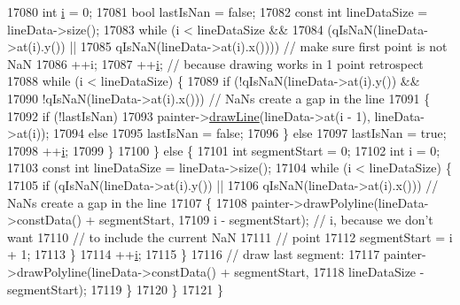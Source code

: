 \begin{DoxyCode}
17080       \textcolor{keywordtype}{int} \hyperlink{_comparision_pictures_2_createtest_image_8m_a6f6ccfcf58b31cb6412107d9d5281426}{i} = 0;
17081       \textcolor{keywordtype}{bool} lastIsNan = \textcolor{keyword}{false};
17082       \textcolor{keyword}{const} \textcolor{keywordtype}{int} lineDataSize = lineData->size();
17083       \textcolor{keywordflow}{while} (i < lineDataSize &&
17084              (qIsNaN(lineData->at(i).y()) ||
17085               qIsNaN(lineData->at(i).x()))) \textcolor{comment}{// make sure first point is not NaN}
17086         ++i;
17087       ++\hyperlink{_comparision_pictures_2_createtest_image_8m_a6f6ccfcf58b31cb6412107d9d5281426}{i}; \textcolor{comment}{// because drawing works in 1 point retrospect}
17088       \textcolor{keywordflow}{while} (i < lineDataSize) \{
17089         \textcolor{keywordflow}{if} (!qIsNaN(lineData->at(i).y()) &&
17090             !qIsNaN(lineData->at(i).x())) \textcolor{comment}{// NaNs create a gap in the line}
17091         \{
17092           \textcolor{keywordflow}{if} (!lastIsNan)
17093             painter->\hyperlink{class_q_c_p_painter_a0b4b1b9bd495e182c731774dc800e6e0}{drawLine}(lineData->at(i - 1), lineData->at(i));
17094           \textcolor{keywordflow}{else}
17095             lastIsNan = \textcolor{keyword}{false};
17096         \} \textcolor{keywordflow}{else}
17097           lastIsNan = \textcolor{keyword}{true};
17098         ++\hyperlink{_comparision_pictures_2_createtest_image_8m_a6f6ccfcf58b31cb6412107d9d5281426}{i};
17099       \}
17100     \} \textcolor{keywordflow}{else} \{
17101       \textcolor{keywordtype}{int} segmentStart = 0;
17102       \textcolor{keywordtype}{int} i = 0;
17103       \textcolor{keyword}{const} \textcolor{keywordtype}{int} lineDataSize = lineData->size();
17104       \textcolor{keywordflow}{while} (i < lineDataSize) \{
17105         \textcolor{keywordflow}{if} (qIsNaN(lineData->at(i).y()) ||
17106             qIsNaN(lineData->at(i).x())) \textcolor{comment}{// NaNs create a gap in the line}
17107         \{
17108           painter->drawPolyline(lineData->constData() + segmentStart,
17109                                 i - segmentStart); \textcolor{comment}{// i, because we don't want}
17110                                                    \textcolor{comment}{// to include the current NaN}
17111                                                    \textcolor{comment}{// point}
17112           segmentStart = i + 1;
17113         \}
17114         ++\hyperlink{_comparision_pictures_2_createtest_image_8m_a6f6ccfcf58b31cb6412107d9d5281426}{i};
17115       \}
17116       \textcolor{comment}{// draw last segment:}
17117       painter->drawPolyline(lineData->constData() + segmentStart,
17118                             lineDataSize - segmentStart);
17119     \}
17120   \}
17121 \}
\end{DoxyCode}


